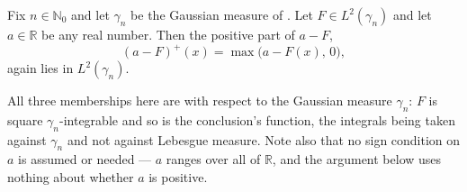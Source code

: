 \begin{lemma}
Fix $n \in \mathbb{N}_0$ and let $\gamma_n$ be the Gaussian measure of
.  Let $F \in L^2(\gamma_n)$ and let $a \in \mathbb{R}$ be
any real number.  Then the positive part of $a - F$,
\[
  (a - F)^{+}(x) = \max\bigl(a - F(x),\, 0\bigr),
\]
again lies in $L^2(\gamma_n)$.

All three memberships here are with respect to the Gaussian measure $\gamma_n$:
$F$ is square $\gamma_n$-integrable and so is the conclusion's function, the
integrals being taken against $\gamma_n$ and not against Lebesgue measure.  Note
also that no sign condition on $a$ is assumed or needed --- $a$ ranges over all
of $\mathbb{R}$, and the argument below uses nothing about whether $a$ is
positive.
\end{lemma}
